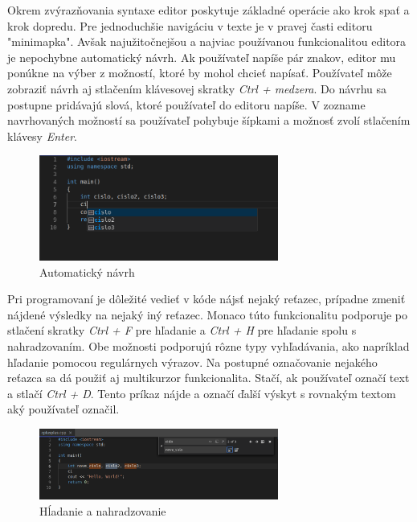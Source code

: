 Okrem zvýrazňovania syntaxe editor poskytuje základné operácie ako krok spať a krok dopredu. Pre
jednoduchšie navigáciu v texte je v pravej časti editoru "minimapka". Avšak najužitočnejšou a
najviac používanou funkcionalitou editora je nepochybne automatický návrh. Ak používateľ napíše pár
znakov, editor mu ponúkne na výber z možností, ktoré by mohol chcieť napísať. Používateľ môže
zobraziť návrh aj stlačením klávesovej skratky \textit{Ctrl + medzera}. Do návrhu sa postupne
pridávajú slová, ktoré používateľ do editoru napíše. V zozname navrhovaných možností sa používateľ
pohybuje šípkami a možnosť zvolí stlačením klávesy \textit{Enter}.
\begin{figure}[H]
\centerline{\includegraphics[width=0.7\textwidth]{images/automaticky_navrh}}
\caption[Automatický návrh]{Automatický návrh}
\label{obr:automaticky_navrh}
\end{figure}

Pri programovaní je dôležité vedieť v kóde nájsť nejaký reťazec, prípadne zmeniť nájdené výsledky na
nejaký iný reťazec. Monaco túto funkcionalitu podporuje po stlačení skratky \textit{Ctrl + F} pre
hľadanie a \textit{Ctrl + H} pre hľadanie spolu s nahradzovaním. Obe možnosti podporujú rôzne typy
vyhľadávania, ako napríklad hľadanie pomocou regulárnych výrazov. Na postupné označovanie nejakého
reťazca sa dá použiť aj multikurzor funkcionalita. Stačí, ak používateľ označí text a stlačí
\textit{Ctrl + D}. Tento príkaz nájde a označí ďalší výskyt s rovnakým textom aký používateľ
označil. 
\begin{figure}[H]
\centerline{\includegraphics[width=0.7\textwidth]{images/hladanie_nahradzovanie}}
\caption[Hĺadanie a nahradzovanie]{Hĺadanie a nahradzovanie}
\label{obr:hladanie_nahradzovanie}
\end{figure}

